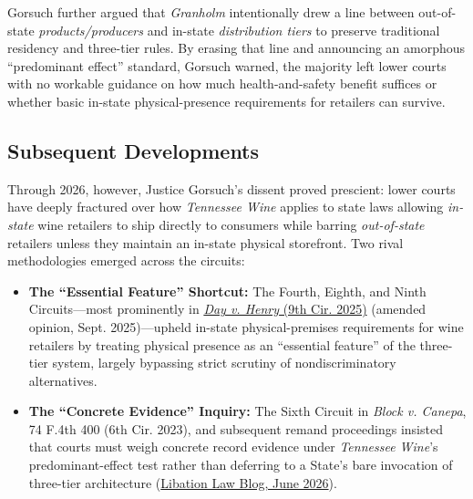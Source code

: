 \documentclass[12pt]{article}
\begin{document}
Gorsuch further argued that \textit{Granholm} intentionally drew a line between out-of-state \textit{products/producers} and in-state \textit{distribution tiers} to preserve traditional residency and three-tier rules. By erasing that line and announcing an amorphous ``predominant effect'' standard, Gorsuch warned, the majority left lower courts with no workable guidance on how much health-and-safety benefit suffices or whether basic in-state physical-presence requirements for retailers can survive.

\subsection{Subsequent Developments}

Through 2026, however, Justice Gorsuch's dissent proved prescient: lower courts have deeply fractured over how \textit{Tennessee Wine} applies to state laws allowing \textit{in-state} wine retailers to ship directly to consumers while barring \textit{out-of-state} retailers unless they maintain an in-state physical storefront. Two rival methodologies emerged across the circuits:

\begin{itemize}
    \item \textbf{The ``Essential Feature'' Shortcut:} The Fourth, Eighth, and Ninth Circuits---most prominently in \href{https://cdn.ca9.uscourts.gov/datastore/opinions/2025/09/05/23-16148.pdf}{\textit{Day v. Henry} (9th Cir. 2025)} (amended opinion, Sept. 2025)---upheld in-state physical-premises requirements for wine retailers by treating physical presence as an ``essential feature'' of the three-tier system, largely bypassing strict scrutiny of nondiscriminatory alternatives.
    \item \textbf{The ``Concrete Evidence'' Inquiry:} The Sixth Circuit in \textit{Block v. Canepa}, 74 F.4th 400 (6th Cir. 2023), and subsequent remand proceedings insisted that courts must weigh concrete record evidence under \textit{Tennessee Wine}'s predominant-effect test rather than deferring to a State's bare invocation of three-tier architecture (\href{https://libationlawblog.com/2026/06/24/ohio-wine-shipping-supreme-court-cert-petition/}{Libation Law Blog, June 2026}).
\end{itemize}
\end{document}
